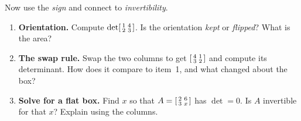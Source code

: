 \documentclass[10pt]{article}
\begin{document}
\begin{tcolorbox}[colback=white, colframe=black!40, title=\textbf{Tier A --- Approaching Proficiency},
    fonttitle=\bfseries, arc=1.5mm, left=3mm, right=3mm, top=2mm, bottom=2mm, breakable]
Now use the \emph{sign} and connect to \emph{invertibility}.
\begin{enumerate}[leftmargin=1.7em, itemsep=9pt]
  \item \textbf{Orientation.} Compute $\det\begin{bsmallmatrix} 1 & 4\\ 2 & 3 \end{bsmallmatrix}$. Is the
        orientation \emph{kept} or \emph{flipped}? What is the area? 
  \item \textbf{The swap rule.} Swap the two columns to get $\begin{bsmallmatrix} 4 & 1\\ 3 & 2 \end{bsmallmatrix}$
        and compute its determinant. How does it compare to item~1, and what changed about the box? 
  \item \textbf{Solve for a flat box.} Find $x$ so that $A=\begin{bsmallmatrix} 2 & 6\\ 3 & x \end{bsmallmatrix}$
        has $\det=0$. Is $A$ invertible for that $x$? Explain using the columns. 
\end{enumerate}
\end{tcolorbox}
\end{document}
